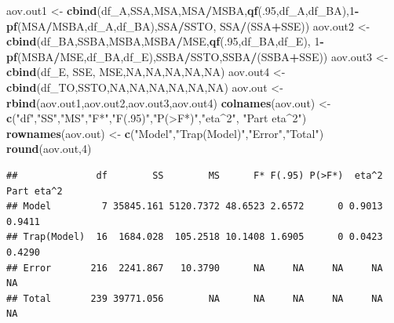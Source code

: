 \documentclass[
]{book}
\newenvironment{Shaded}{\begin{snugshade}}{\end{snugshade}}
\newcommand{\ConstantTok}[1]{\textcolor[rgb]{0.56,0.35,0.01}{#1}}
\newcommand{\DecValTok}[1]{\textcolor[rgb]{0.00,0.00,0.81}{#1}}
\newcommand{\FunctionTok}[1]{\textcolor[rgb]{0.13,0.29,0.53}{\textbf{#1}}}
\newcommand{\NormalTok}[1]{#1}
\newcommand{\OtherTok}[1]{\textcolor[rgb]{0.56,0.35,0.01}{#1}}
\newcommand{\SpecialCharTok}[1]{\textcolor[rgb]{0.81,0.36,0.00}{\textbf{#1}}}
\newcommand{\StringTok}[1]{\textcolor[rgb]{0.31,0.60,0.02}{#1}}
\begin{document}
\begin{Shaded}
\begin{Highlighting}[]
\NormalTok{aov.out1 }\OtherTok{\textless{}{-}} \FunctionTok{cbind}\NormalTok{(df\_A,SSA,MSA,MSA}\SpecialCharTok{/}\NormalTok{MSBA,}\FunctionTok{qf}\NormalTok{(.}\DecValTok{95}\NormalTok{,df\_A,df\_BA),}\DecValTok{1}\SpecialCharTok{{-}}\FunctionTok{pf}\NormalTok{(MSA}\SpecialCharTok{/}\NormalTok{MSBA,df\_A,df\_BA),SSA}\SpecialCharTok{/}\NormalTok{SSTO, SSA}\SpecialCharTok{/}\NormalTok{(SSA}\SpecialCharTok{+}\NormalTok{SSE))}
\NormalTok{aov.out2 }\OtherTok{\textless{}{-}} \FunctionTok{cbind}\NormalTok{(df\_BA,SSBA,MSBA,MSBA}\SpecialCharTok{/}\NormalTok{MSE,}\FunctionTok{qf}\NormalTok{(.}\DecValTok{95}\NormalTok{,df\_BA,df\_E),}
                  \DecValTok{1}\SpecialCharTok{{-}}\FunctionTok{pf}\NormalTok{(MSBA}\SpecialCharTok{/}\NormalTok{MSE,df\_BA,df\_E),SSBA}\SpecialCharTok{/}\NormalTok{SSTO,SSBA}\SpecialCharTok{/}\NormalTok{(SSBA}\SpecialCharTok{+}\NormalTok{SSE))}
\NormalTok{aov.out3 }\OtherTok{\textless{}{-}} \FunctionTok{cbind}\NormalTok{(df\_E, SSE, MSE,}\ConstantTok{NA}\NormalTok{,}\ConstantTok{NA}\NormalTok{,}\ConstantTok{NA}\NormalTok{,}\ConstantTok{NA}\NormalTok{,}\ConstantTok{NA}\NormalTok{)}
\NormalTok{aov.out4 }\OtherTok{\textless{}{-}} \FunctionTok{cbind}\NormalTok{(df\_TO,SSTO,}\ConstantTok{NA}\NormalTok{,}\ConstantTok{NA}\NormalTok{,}\ConstantTok{NA}\NormalTok{,}\ConstantTok{NA}\NormalTok{,}\ConstantTok{NA}\NormalTok{,}\ConstantTok{NA}\NormalTok{)}
\NormalTok{aov.out }\OtherTok{\textless{}{-}} \FunctionTok{rbind}\NormalTok{(aov.out1,aov.out2,aov.out3,aov.out4)}
\FunctionTok{colnames}\NormalTok{(aov.out) }\OtherTok{\textless{}{-}} \FunctionTok{c}\NormalTok{(}\StringTok{"df"}\NormalTok{,}\StringTok{"SS"}\NormalTok{,}\StringTok{"MS"}\NormalTok{,}\StringTok{"F*"}\NormalTok{,}\StringTok{"F(.95)"}\NormalTok{,}\StringTok{"P(\textgreater{}F*)"}\NormalTok{,}\StringTok{"eta\^{}2"}\NormalTok{, }\StringTok{"Part eta\^{}2"}\NormalTok{)}
\FunctionTok{rownames}\NormalTok{(aov.out) }\OtherTok{\textless{}{-}} \FunctionTok{c}\NormalTok{(}\StringTok{"Model"}\NormalTok{,}\StringTok{"Trap(Model)"}\NormalTok{,}\StringTok{"Error"}\NormalTok{,}\StringTok{"Total"}\NormalTok{)}
\FunctionTok{round}\NormalTok{(aov.out,}\DecValTok{4}\NormalTok{)}
\end{Highlighting}
\end{Shaded}

\begin{verbatim}
##              df        SS        MS      F* F(.95) P(>F*)  eta^2 Part eta^2
## Model         7 35845.161 5120.7372 48.6523 2.6572      0 0.9013     0.9411
## Trap(Model)  16  1684.028  105.2518 10.1408 1.6905      0 0.0423     0.4290
## Error       216  2241.867   10.3790      NA     NA     NA     NA         NA
## Total       239 39771.056        NA      NA     NA     NA     NA         NA
\end{verbatim}
\end{document}
